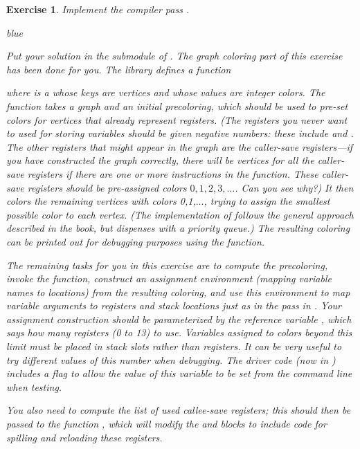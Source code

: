 \documentclass[11pt]{book}
\newenvironment{ocamlx}{
  \begin{color}{blue}
}
{
  \end{color}
}
\newtheorem{exercise}[theorem]{Exercise}
\begin{document}
{\begin{exercise}\normalfont
%
Implement the compiler pass .
%
\begin{ocamlx}
  Put your solution in the  submodule
  of . 
  The graph coloring part of this exercise has been
  done for you. The  library defines a function


\noindent
  where  is a  whose keys are vertices
  and whose values are integer colors. The 
  function takes a graph and an initial precoloring, which should be
  used to pre-set colors for vertices that already represent
  registers. (The registers you never want to used for storing variables
  should be given negative numbers: these include  and  .
  The other registers that might appear in the graph are the caller-save
  registers---if you have constructed the graph correctly, there will be
  vertices for all the caller-save registers \emph{if} there are one or
  more  instructions in the function. These caller-save registers
  should be pre-assigned colors $0,1,2,3,\ldots$. Can you see why?)
  It then colors the remaining
  vertices with colors 0,1,$\ldots$, trying to assign the smallest
  possible color to each vertex.  (The implementation of 
  follows the general approach described in the book, but dispenses
  with a priority queue.) The resulting coloring can be
  printed out for debugging purposes using the 
  function.

  The remaining tasks for you in this exercise are to compute
  the precoloring, invoke the  function,
  construct an assignment environment (mapping variable names to locations)
  from the resulting coloring, and use this environment to map
  variable arguments to registers and stack locations just as in
  the  pass in .
  Your assignment construction should be parameterized by the reference
  variable , which says how many registers (0 to 13) to
  use. Variables assigned to colors beyond this limit must be placed
  in stack slots rather than registers. It can be very useful to try different values of this number when
  debugging. The driver code (now in ) includes a flag to allow
  the value of this variable to be set from the command line when testing.

  You also need to compute the list of used callee-save registers; this should
  then be passed to the function , which
  will modify the  and  blocks to include
  code for spilling and reloading these registers.


\end{ocamlx}
\end{exercise}}
\end{document}
